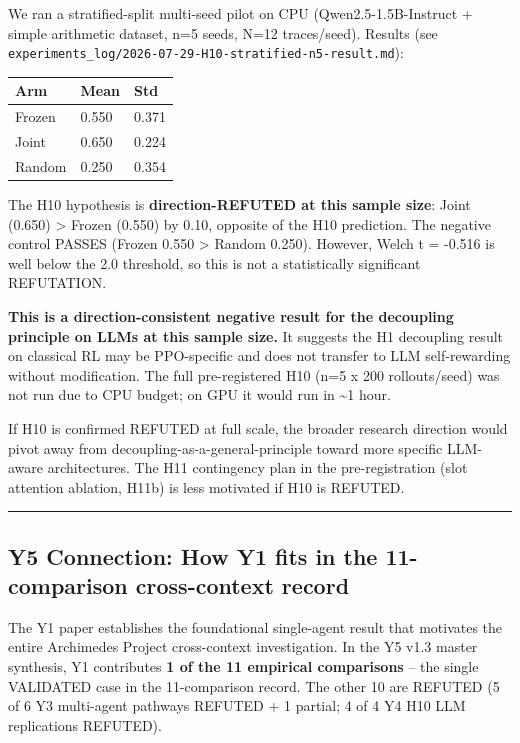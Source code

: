 \documentclass[
]{article}
\newcounter{none} %
\begin{document}
We ran a stratified-split multi-seed pilot on CPU (Qwen2.5-1.5B-Instruct
+ simple arithmetic dataset, n=5 seeds, N=12 traces/seed). Results (see
\texttt{experiments\_log/2026-07-29-H10-stratified-n5-result.md}):

{\def\LTcaptype{none} %
\begin{longtable}[]{@{}lll@{}}
\toprule\noalign{}
Arm & Mean & Std \\
\midrule\noalign{}
\endhead
\bottomrule\noalign{}
\endlastfoot
Frozen & 0.550 & 0.371 \\
Joint & 0.650 & 0.224 \\
Random & 0.250 & 0.354 \\
\end{longtable}
}

The H10 hypothesis is \textbf{direction-REFUTED at this sample size}:
Joint (0.650) \textgreater{} Frozen (0.550) by 0.10, opposite of the H10
prediction. The negative control PASSES (Frozen 0.550 \textgreater{}
Random 0.250). However, Welch t = -0.516 is well below the 2.0
threshold, so this is not a statistically significant REFUTATION.

\textbf{This is a direction-consistent negative result for the
decoupling principle on LLMs at this sample size.} It suggests the H1
decoupling result on classical RL may be PPO-specific and does not
transfer to LLM self-rewarding without modification. The full
pre-registered H10 (n=5 x 200 rollouts/seed) was not run due to CPU
budget; on GPU it would run in \textasciitilde1 hour.

If H10 is confirmed REFUTED at full scale, the broader research
direction would pivot away from decoupling-as-a-general-principle toward
more specific LLM-aware architectures. The H11 contingency plan in the
pre-registration (slot attention ablation, H11b) is less motivated if
H10 is REFUTED.

\begin{center}\rule{0.5\linewidth}{0.5pt}\end{center}

\subsection{Y5 Connection: How Y1 fits in the 11-comparison
cross-context
record}\label{y5-connection-how-y1-fits-in-the-11-comparison-cross-context-record}

The Y1 paper establishes the foundational single-agent result that
motivates the entire Archimedes Project cross-context investigation. In
the Y5 v1.3 master synthesis, Y1 contributes \textbf{1 of the 11
empirical comparisons} -- the single VALIDATED case in the 11-comparison
record. The other 10 are REFUTED (5 of 6 Y3 multi-agent pathways REFUTED
+ 1 partial; 4 of 4 Y4 H10 LLM replications REFUTED).
\end{document}
